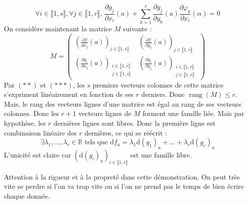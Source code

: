 \begin{demonstration}
		\[ \forall i \in \llbracket 1, s \rrbracket, \forall j \in \llbracket 1, r \rrbracket, \, \frac{\partial g_j}{\partial x_i}(a) + \sum_{k=1}^r \frac{\partial g_j}{\partial y_k}(a) \frac{\partial \varphi_k}{\partial x_i}(\alpha) = 0 \tag{$***$} \]
		\newpar
		On considère maintenant la matrice $M$ suivante :
		\[ M = \begin{pmatrix}
			\left( \frac{\partial f}{\partial x_j}(a) \right)_{j \in \llbracket 1, s \rrbracket} & \left( \frac{\partial f}{\partial y_j}(a) \right)_{j \in \llbracket 1, r \rrbracket} \\
			\left( \frac{\partial g_i}{\partial x_j}(a) \right)_{\substack{i \in \llbracket 1, r \rrbracket \\ j \in \llbracket 1, s \rrbracket}} & \left( \frac{\partial g_i}{\partial y_j}(a) \right)_{\substack{i \in \llbracket 1, r \rrbracket \\ j \in \llbracket 1, r \rrbracket}}
		\end{pmatrix} \]
		Par $(**)$ et $(***)$, les $s$ premiers vecteurs colonnes de cette matrice s'expriment linéairement en fonction de ses $r$ derniers. Donc $\operatorname{rang}(M) \leq r$. Mais, le rang des vecteurs lignes d'une matrice est égal au rang de ses vecteurs colonnes. Donc les $r+1$ vecteurs lignes de $M$ forment une famille liée. Mais par hypothèse, les $r$ dernières lignes sont libres. Donc la première ligne est combinaison linéaire des $r$ dernières, ce qui se réécrit :
		\[ \exists \lambda_1, \dots, \lambda_r \in \mathbb{R} \text{ tels que } \mathrm{d}f_a = \lambda_1 \mathrm{d}(g_1)_a + \dots + \lambda_r \mathrm{d}(g_r)_a \]
		L'unicité est claire car $(\mathrm{d}(g_i)_a)_{i \in \llbracket 1, r \rrbracket}$ est une famille libre.
	\end{demonstration}

	\begin{remark}
		Attention à la rigueur et à la propreté dans cette démonstration. On peut très vite se perdre si l'on va trop vite ou si l'on ne prend pas le temps de bien écrire chaque donnée.
	\end{remark}


